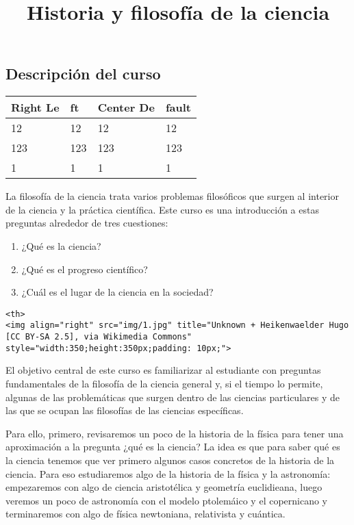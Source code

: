 \documentclass[spanish,]{article}
\title{Historia y filosofía de la ciencia}
\date{}
\providecommand{\tightlist}{%
  \setlength{\itemsep}{0pt}\setlength{\parskip}{0pt}}
\begin{document}
\maketitle

\subsection{Descripción del curso}\label{descripciuxf3n-del-curso}

\begin{longtable}[]{@{}llll@{}}
\toprule
Right Le & ft & Center De & fault\tabularnewline
\midrule
\endhead
12 & 12 & 12 & 12\tabularnewline
123 & 123 & 123 & 123\tabularnewline
1 & 1 & 1 & 1\tabularnewline
\bottomrule
\end{longtable}

La filosofía de la ciencia trata varios problemas filosóficos que surgen
al interior de la ciencia y la práctica científica. Este curso es una
introducción a estas preguntas alrededor de tres cuestiones:

\begin{enumerate}
\def\labelenumi{\arabic{enumi}.}
\tightlist
\item
  ¿Qué es la ciencia?
\item
  ¿Qué es el progreso científico?
\item
  ¿Cuál es el lugar de la ciencia en la sociedad?
\end{enumerate}

\begin{verbatim}
<th>
<img align="right" src="img/1.jpg" title="Unknown + Heikenwaelder Hugo [CC BY-SA 2.5], via Wikimedia Commons" style="width:350;height:350px;padding: 10px;">
\end{verbatim}

El objetivo central de este curso es familiarizar al estudiante con
preguntas fundamentales de la filosofía de la ciencia general y, si el
tiempo lo permite, algunas de las problemáticas que surgen dentro de las
ciencias particulares y de las que se ocupan las filosofías de las
ciencias específicas.

Para ello, primero, revisaremos un poco de la historia de la física para
tener una aproximación a la pregunta ¿qué es la ciencia? La idea es que
para saber qué es la ciencia tenemos que ver primero algunos casos
concretos de la historia de la ciencia. Para eso estudiaremos algo de la
historia de la física y la astronomía: empezaremos con algo de ciencia
aristotélica y geometría euclidieana, luego veremos un poco de
astronomía con el modelo ptolemáico y el copernicano y terminaremos con
algo de física newtoniana, relativista y cuántica.
\end{document}
